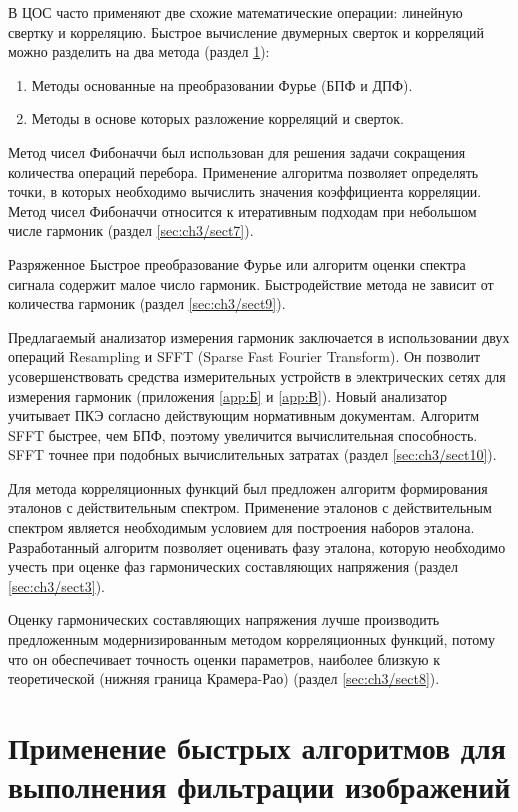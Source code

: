 В ЦОС часто применяют две схожие математические операции: линейную свертку и корреляцию. Быстрое вычисление двумерных сверток и корреляций можно разделить на два метода (раздел \ref{sec:ch3/sect1}): 
\begin{enumerate}
	\item Методы основанные на преобразовании Фурье (БПФ и ДПФ).
	\item Методы в основе которых разложение корреляций и сверток.
\end{enumerate}

Метод чисел Фибоначчи был использован для решения задачи сокращения количества операций перебора. Применение алгоритма позволяет  определять точки, в которых необходимо вычислить значения коэффициента корреляции. Метод чисел Фибоначчи относится к итеративным подходам при небольшом числе гармоник (раздел \ref{sec:ch3/sect7}). 

Разряженное Быстрое преобразование Фурье или алгоритм оценки спектра сигнала содержит малое число гармоник. Быстродействие метода не зависит от количества гармоник (раздел \ref{sec:ch3/sect9}).

Предлагаемый анализатор измерения гармоник заключается в использовании двух операций Resampling и SFFT (Sparse Fast Fourier Transform). Он позволит усовершенствовать средства измерительных устройств в электрических сетях для измерения гармоник (приложения \ref{app:Б} и \ref{app:В}). Новый анализатор учитывает ПКЭ согласно действующим нормативным документам. Алгоритм SFFT быстрее, чем БПФ, поэтому увеличится вычислительная способность. SFFT точнее при подобных вычислительных затратах (раздел \ref{sec:ch3/sect10}). 

Для метода корреляционных функций был предложен алгоритм формирования эталонов с действительным спектром. Применение эталонов с действительным спектром является необходимым условием для построения наборов эталона. Разработанный алгоритм позволяет оценивать фазу эталона, которую необходимо учесть при оценке фаз гармонических составляющих напряжения (раздел \ref{sec:ch3/sect3}). 

Оценку гармонических составляющих напряжения лучше производить предложенным модернизированным методом корреляционных функций, потому что он обеспечивает точность оценки параметров, наиболее близкую к теоретической (нижняя граница Крамера-Рао) (раздел \ref{sec:ch3/sect8}). 

\section{Применение быстрых алгоритмов для выполнения фильтрации изображений} \label{sec:ch3/sect1}

